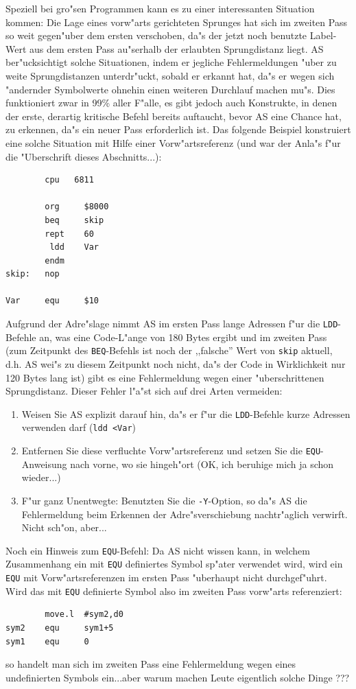 \documentclass[12pt,a4paper,twoside]{report}
\newcommand{\tty}[1]{{\tt #1}}
\newcommand{\asname}{AS}
\begin{document}
Speziell bei gro"sen Programmen kann es zu einer interessanten Situation
kommen: Die Lage eines vorw"arts gerichteten Sprunges hat sich
im zweiten Pass so weit gegen"uber dem ersten verschoben, da"s der
jetzt noch benutzte Label-Wert aus dem ersten Pass au"serhalb der
erlaubten Sprungdistanz liegt.  \asname{} ber"ucksichtigt solche Situationen,
indem er jegliche Fehlermeldungen "uber zu weite Sprungdistanzen unterdr"uckt,
sobald er erkannt hat, da"s er wegen sich "andernder Symbolwerte ohnehin
einen weiteren Durchlauf machen mu"s.  Dies funktioniert zwar in 99\%
aller F"alle, es gibt jedoch auch Konstrukte, in denen der erste, derartig
kritische Befehl bereits auftaucht, bevor \asname{} eine Chance hat, zu erkennen,
da"s ein neuer Pass erforderlich ist.  Das folgende Beispiel konstruiert
eine solche Situation mit Hilfe einer Vorw"artsreferenz (und war der
Anla"s f"ur die "Uberschrift dieses Abschnitts...):
\begin{verbatim}
        cpu   6811

        org     $8000
        beq     skip
        rept    60
         ldd    Var
        endm
skip:   nop

Var     equ     $10
\end{verbatim}
Aufgrund der Adre"slage nimmt \asname{} im ersten Pass lange Adressen f"ur die
\tty{LDD}-Befehle an, was eine Code-L"ange von 180 Bytes ergibt und im
zweiten Pass (zum Zeitpunkt des \tty{BEQ}-Befehls ist noch der ,,falsche''
Wert von \tty{skip} aktuell, d.h. \asname{} wei"s zu diesem Zeitpunkt noch nicht,
da"s der Code in Wirklichkeit nur 120 Bytes lang ist) gibt es eine
Fehlermeldung wegen einer "uberschrittenen Sprungdistanz.  Dieser Fehler
l"a"st sich auf drei Arten vermeiden:
\begin{enumerate}
\item{Weisen Sie \asname{} explizit darauf hin, da"s er f"ur die \tty{LDD}-Befehle
      kurze Adressen verwenden darf (\tty{ldd <Var})}
\item{Entfernen Sie diese verfluchte Vorw"artsreferenz und
      setzen Sie die \tty{EQU}-Anweisung nach vorne, wo sie hingeh"ort
      (OK, ich beruhige mich ja schon wieder...)}
\item{F"ur ganz Unentwegte: Benutzten Sie die \tty{-Y}-Option, so da"s \asname{} die
      Fehlermeldung beim Erkennen der Adre"sverschiebung nachtr"aglich
      verwirft.  Nicht sch"on, aber...}
\end{enumerate}
Noch ein Hinweis zum \tty{EQU}-Befehl:  Da \asname{} nicht wissen kann, in welchem
Zusammenhang ein mit \tty{EQU} definiertes Symbol sp"ater verwendet wird,
wird ein \tty{EQU} mit Vorw"artsreferenzen im ersten Pass "uberhaupt nicht
durchgef"uhrt.  Wird das mit \tty{EQU} definierte Symbol also im zweiten
Pass vorw"arts referenziert:
\begin{verbatim}
        move.l  #sym2,d0
sym2    equ     sym1+5
sym1    equ     0
\end{verbatim}
so handelt man sich im zweiten Pass eine Fehlermeldung wegen eines
undefinierten Symbols ein...aber warum machen Leute eigentlich solche
Dinge ???
\end{document}
